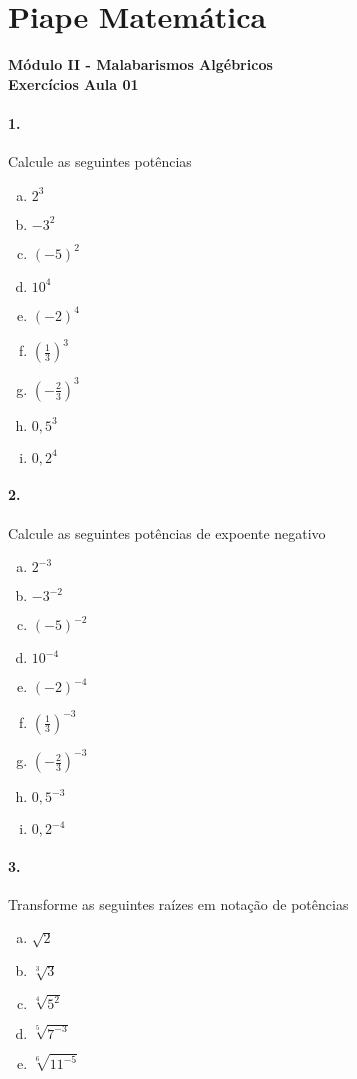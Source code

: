 \documentclass[a4paper,twocolumn,12pt]{article}
\begin{document}
 
  
\section*{Piape Matemática} 
\textbf{Módulo II - Malabarismos Algébricos}\\
\textbf{Exercícios Aula 01}         

\paragraph{1.} Calcule as seguintes potências
\begin{enumerate}[a)]
    \item $2^3$
    \item $-3^2$
    \item $(-5)^2$
    \item $10^4$
    \item $(-2)^4$
    \item $\left(\displaystyle\frac{1}{3}\right)^3$
    \item $\left(\displaystyle-\frac{2}{3}\right)^3$
    \item $0,\!5^3$
    \item $0,\!2^4$
\end{enumerate}

\paragraph*{2.} Calcule as seguintes potências de expoente negativo
\begin{enumerate}[a)]
    \item $2^{-3}$
    \item $-3^{-2}$
    \item $(-5)^{-2}$
    \item $10^{-4}$
    \item $(-2)^{-4}$
    \item $\left(\displaystyle\frac{1}{3}\right)^{-3}$
    \item $\left(\displaystyle-\frac{2}{3}\right)^{-3}$
    \item $0,\!5^{-3}$
    \item $0,\!2^{-4}$
\end{enumerate}

\paragraph*{3.} Transforme as seguintes raízes em notação de potências
\begin{enumerate}[a)]
    \item $\sqrt{2}$
    \item $\sqrt[3]{3}$
    \item $\sqrt[4]{5^2}$
    \item $\sqrt[5]{7^{-3}}$
    \item $\sqrt[6]{11^{-5}}$
\end{enumerate}
\end{document}
